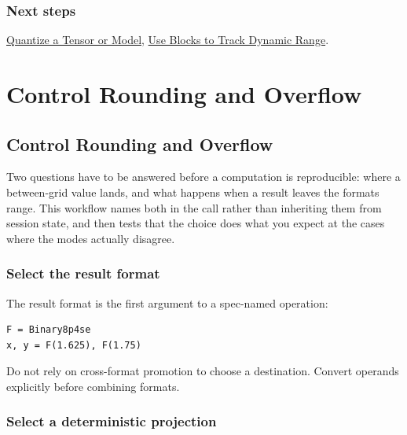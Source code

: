 \subsection{Next steps}



\label{3807517405601295309}{}


\href{workflow\_\allowbreak{}quantize\_\allowbreak{}measure.md}{Quantize a Tensor or Model}, \href{workflow\_\allowbreak{}blocks.md}{Use Blocks to Track Dynamic Range}.



\chapter{Control Rounding and Overflow}


\section{Control Rounding and Overflow}



\label{11237019648960478617}{}


Two questions have to be answered before a computation is reproducible: where a between-grid value lands, and what happens when a result leaves the format{\textquotesingle}s range. This workflow names both in the call rather than inheriting them from session state, and then tests that the choice does what you expect at the cases where the modes actually disagree.



\subsection{Select the result format}



\label{17873683483916617002}{}


The result format is the first argument to a spec-named operation:




\nopagebreak[4]
\begin{verbatim}
F = Binary8p4se
x, y = F(1.625), F(1.75)
\end{verbatim}



Do not rely on cross-format promotion to choose a destination. Convert operands explicitly before combining formats.



\subsection{Select a deterministic projection}



